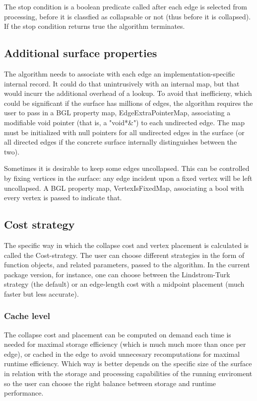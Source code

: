The stop condition is a boolean predicate called after each edge is selected from processing, before it is classfied as collapsable or not (thus before it is collapsed). If the stop condition returns true the algorithm terminates.

\subsection{Additional surface properties}

The algorithm needs to associate with each edge an implementation-specific internal record. It could do that unintrusively with an internal map, but that would incurr the additional overhead of a lookup. To avoid that inefficieny, which could be significant if the surface has millions of edges, the algorithm requires the user to pass in a BGL property map, EdgeExtraPointerMap, associating a modifiable void pointer (that is, a "void*&") to each undirected edge. The map must be initialized with null pointers for all undirected edges in the surface (or all directed edges if the concrete surface internally distinguishes between the two). 

Sometimes it is desirable to keep some edges uncollapsed. This can be controlled by fixing vertices in the surface: any edge incident upon a fixed vertex will be left uncollapsed. A BGL property map, VertexIsFixedMap,  associating a bool with every vertex is passed to indicate that.

\subsection{Cost strategy}

The specific way in which the collapse cost and vertex placement is calculated is called the Cost-strategy.
The user can choose different strategies in the form of function objects, and related parameters, passed to the algorithm.
In the current package version, for instance, one can choose between the Lindstrom-Turk strategy (the default) or an edge-length cost with a midpoint placement (much faster but less accurate).

\subsubsection{Cache level}

The collapse cost and placement can be computed on demand each time is needed for maximal storage efficiency  (which is much much more than once per edge), or cached in the edge to avoid unnecesary recomputations for maximal runtime efficiency. Which way is better depends on the specific size of the surface in relation with the storage and processing capabilities of the running enviroment so the user can choose the right balance between storage and runtime performance.

